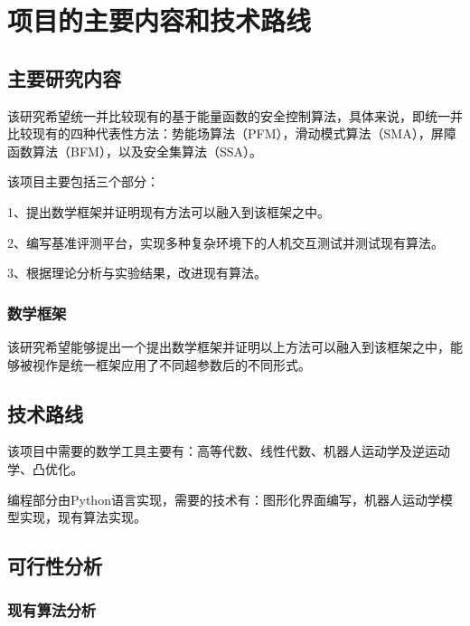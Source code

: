 \section{项目的主要内容和技术路线}

\subsection{主要研究内容}

该研究希望统一并比较现有的基于能量函数的安全控制算法，具体来说，即统一并比较现有的四种代表性方法：势能场算法（PFM）\cite{khatib1986real}，滑动模式算法（SMA）\cite{gracia2013reactive}，屏障函数算法（BFM）\cite{ames2014control}，以及安全集算法（SSA）\cite{liu2014control}。

该项目主要包括三个部分：

1、提出数学框架并证明现有方法可以融入到该框架之中。

2、编写基准评测平台，实现多种复杂环境下的人机交互测试并测试现有算法。

3、根据理论分析与实验结果，改进现有算法。

\subsubsection{数学框架}

该研究希望能够提出一个提出数学框架并证明以上方法可以融入到该框架之中，能够被视作是统一框架应用了不同超参数后的不同形式。

\subsection{技术路线}

该项目中需要的数学工具主要有：高等代数、线性代数、机器人运动学及逆运动学、凸优化。

编程部分由Python语言实现，需要的技术有：图形化界面编写，机器人运动学模型实现，现有算法实现。

\subsection{可行性分析}

\subsubsection{现有算法分析}

